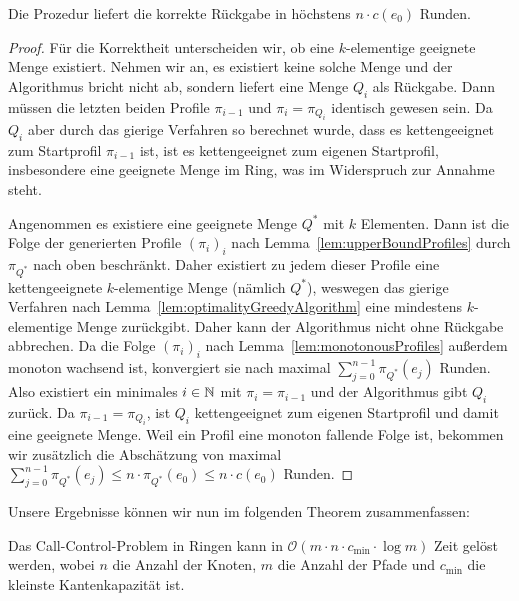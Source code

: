 \begin{lemma}\label{lem:decisionProcedure}
    Die Prozedur liefert die korrekte Rückgabe in höchstens $n\cdot c(e_0)$ Runden.
\end{lemma}
\begin{proof}
    Für die Korrektheit unterscheiden wir, ob eine $k$-elementige geeignete Menge existiert.
    Nehmen wir an, es existiert keine solche Menge und der Algorithmus bricht nicht ab, sondern liefert eine Menge $Q_i$
    als Rückgabe.
    Dann müssen die letzten beiden Profile $\pi_{i-1}$ und $\pi_{i} = \pi_{Q_i}$ identisch gewesen sein.
    Da $Q_i$ aber durch das gierige Verfahren so berechnet wurde, dass es kettengeeignet zum Startprofil
    $\pi_{i-1}$ ist, ist es kettengeeignet zum eigenen Startprofil, insbesondere eine geeignete Menge im Ring, was im
    Widerspruch zur Annahme steht.

    Angenommen es existiere eine geeignete Menge $Q^*$ mit $k$ Elementen.
    Dann ist die Folge der generierten Profile $(\pi_i)_{i}$ nach Lemma~\ref{lem:upperBoundProfiles} durch $\pi_{Q^*}$
    nach oben beschränkt.
    Daher existiert zu jedem dieser Profile eine kettengeeignete $k$-elementige Menge (nämlich $Q^*$),
    weswegen das gierige Verfahren nach Lemma~\ref{lem:optimalityGreedyAlgorithm} eine mindestens $k$-elementige Menge zurückgibt.
    Daher kann der Algorithmus nicht ohne Rückgabe abbrechen.
    Da die Folge $(\pi_i)_i$ nach Lemma~\ref{lem:monotonousProfiles} außerdem monoton wachsend ist, konvergiert sie nach
    maximal $\sum_{j=0}^{n-1}\pi_{Q^*}(e_j)$ Runden.
    Also existiert ein minimales $i\in \mathbb N$ mit $\pi_i = \pi_{i-1}$ und der Algorithmus gibt $Q_i$ zurück.
    Da $\pi_{i-1} = \pi_{Q_{i}}$, ist $Q_i$ kettengeeignet zum eigenen Startprofil und damit eine geeignete Menge.
    Weil ein Profil eine monoton fallende Folge ist, bekommen wir zusätzlich die Abschätzung von maximal
    $\sum_{j=0}^{n-1}\pi_{Q^*}(e_j) \leq n \cdot \pi_{Q^*}(e_0) \leq n \cdot c(e_0)$ Runden.
\end{proof}
Unsere Ergebnisse können wir nun im folgenden Theorem zusammenfassen:
\begin{theorem}
    Das Call-Control-Problem in Ringen kann in $\mathcal O(m \cdot n \cdot c_{\min} \cdot \log m)$ Zeit gelöst werden,
    wobei $n$ die Anzahl der Knoten, $m$ die Anzahl der Pfade und $c_{\min}$ die kleinste Kantenkapazität ist.
\end{theorem}
